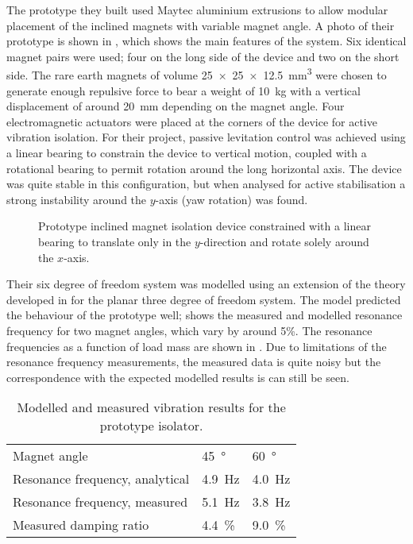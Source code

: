 \documentclass[11pt,a4paper]{memoir}
\begin{document}
The prototype they built used Maytec  aluminium extrusions to allow modular placement of the inclined magnets with variable magnet angle.
A photo of their prototype is shown in , which shows the main features of the system.
Six identical magnet pairs were used; four on the long side of the device and two on the short side.
The rare earth magnets of volume \SI{25x25x12.5}{mm^3} were chosen to generate enough repulsive force to bear a weight of \SI{10}{kg} with a vertical displacement of around \SI{20}{mm} depending on the magnet angle.
Four electromagnetic actuators were placed at the corners of the device for active vibration isolation.
For their project, passive levitation control was achieved using a linear bearing to constrain the device to vertical motion, coupled with a rotational bearing to permit rotation around the long horizontal axis.
The device was quite stable in this configuration, but when analysed for active stabilisation a strong instability around the $y$-axis (yaw rotation) was found.

\begin{figure}
\begin{wide}
\end{wide}
\caption{Prototype inclined magnet isolation device constrained with a linear bearing to translate only in the $y$-direction and rotate solely around the $x$-axis.}
\end{figure}

Their six degree of freedom system was modelled using an extension of the theory developed in  for the planar three degree of freedom system.
The model predicted the behaviour of the prototype well;  shows the measured and modelled resonance frequency for two magnet angles, which vary by around 5\%.
The resonance frequencies as a function of load mass are shown in .
Due to limitations of the resonance frequency measurements, the measured data is quite noisy but the correspondence with the expected modelled results is can still be seen.

\begin{table}
\caption{Modelled and measured vibration results for the prototype isolator.}
\begin{tabular}{@{}lll@{}}
\toprule
Magnet angle & \SI{45}{\degree} & \SI{60}{\degree} \\
Resonance frequency, analytical & \SI{4.9}{Hz} & \SI{4.0}{Hz} \\
Resonance frequency, measured & \SI{5.1}{Hz} & \SI{3.8}{Hz} \\
Measured damping ratio & \SI{4.4}{\%} & \SI{9.0}{\%} \\
\bottomrule
\end{tabular}
\end{table}
\end{document}
